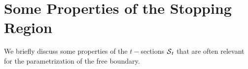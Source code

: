 
\section{Some Properties of the Stopping Region}
We briefly discuss some properties of the $t-$sections $\operatorname{\mathcal{S}}_t$ that are often relevant for the parametrization of the free boundary. 








